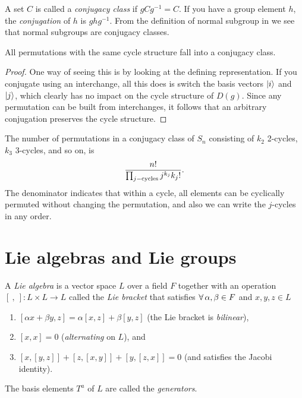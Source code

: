 A set $C$ is called a {\it conjugacy class} if 
$gCg^{-1}=C$. If you have a group element $h$, the 
{\it conjugation} of $h$ is $ghg^{-1}$.
From the definition of normal subgroup in  we
see that normal subgroups are conjugacy classes.

\begin{proposition}{}{}
All permutations with the same cycle structure fall into a conjugacy class.
\begin{proof}
One way of seeing this
is by looking at the defining representation. If you conjugate using
an interchange, all this does is switch the basis vectors
$\ket{i}$ and $\ket{j}$, which clearly has no impact on the cycle
structure of $D(g)$. Since any permutation can be built from interchanges,
it follows that an arbitrary conjugation preserves the cycle
structure. 
\end{proof}
\end{proposition}

The number of permutations in a conjugacy class of $S_n$ consisting
of $k_2$ 2-cycles, $k_3$ 3-cycles, and so on, is
\begin{equation}
\frac{n!}{\prod_{j{\rm -cycles}}j^{k_j}k_j!}.
\end{equation}
The denominator indicates that within a cycle, all elements can be cyclically
permuted without changing the permutation, and also we can write the $j$-cycles
in any order. 


\section{Lie algebras and Lie groups}

  A {\it Lie algebra} is a vector space $L$ over a field $F$
  together with an operation $[\ ,\ ]:L\times L\to L$ called the 
  {\it Lie bracket} that satisfies 
  $\operatorname{\forall} \alpha,\beta\in F$ 
  and $x,y,z\in L$
  \begin{enumerate}
    \item $[\alpha x+\beta y,z]=\alpha[x,z]+\beta[y,z]$ (the Lie bracket is 
          {\it bilinear}),
    \item $[x,x]=0$ ({\it alternating} on $L$), and
    \item $[x,[y,z]]+[z,[x,y]]+[y,[z,x]]=0$ (and satisfies the Jacobi
          identity).
  \end{enumerate}
  The basis elements $T^a$ of $L$ are called the {\it generators}.

